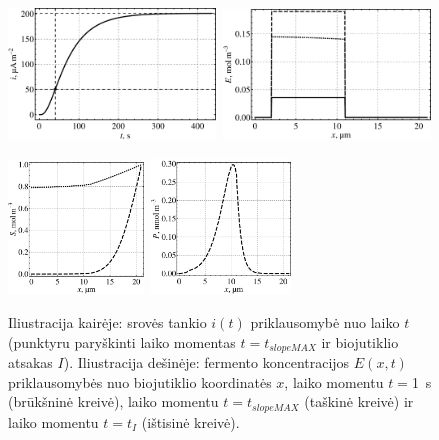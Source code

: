 \documentclass[a4paper,12pt]{article}
\begin{document}
\begin{figure}[ht!]
    \centering
    \includegraphics[clip=true, width=0.49\textwidth]{figures/fig03a.pdf}\,
    \includegraphics[clip=true, width=0.49\textwidth]{figures/fig03b.pdf}
    \caption{Iliustracija kairėje: srovės tankio $i(t)$ priklausomybė nuo laiko $t$ (punktyru paryškinti laiko momentas $t = t_{slopeMAX}$ ir biojutiklio atsakas $I$).
    Iliustracija dešinėje: fermento koncentracijos $E(x,t)$ priklausomybės nuo biojutiklio koordinatės $x$,
    laiko momentu $t ={}$\SI{1}{\second} (brūkšninė kreivė),
    laiko momentu $t = t_{slopeMAX}$ (taškinė kreivė) ir
    laiko momentu $t = t_I$ (ištisinė kreivė).}
    \label{pav03ab}
    \bigskip
    \includegraphics[clip=true, width=0.32\textwidth]{figures/fig03c.pdf}\,
    \includegraphics[clip=true, width=0.33\textwidth]{figures/fig03d.pdf}\,

\end{figure}
\end{document}
